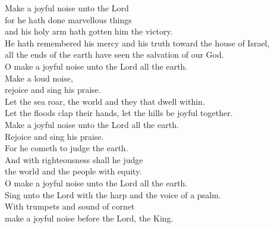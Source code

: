 {\vfill 



\clearpage
{}

\begin{center}
	
Make a joyful noise unto the Lord\\for he hath done marvellous things\\and
his holy arm hath gotten him the victory.\\
He hath remembered his mercy and his truth toward the house of Israel,\\
all the ends of the earth have seen the salvation of our God.\\
O make a joyful noise unto the Lord all the earth.\\Make a loud noise,\\
rejoice and sing his praise.\\
Let the sea roar, the world and they that dwell within.\\
Let the floods clap their hands, let the hills be joyful together.\\
Make a joyful noise unto the Lord all the earth.\\
Rejoice and sing his praise. \\For he cometh to judge the earth.\\
And with righteousness shall he judge\\the world and the people with equity.\\
O make a joyful noise unto the Lord all the earth.\\Sing unto the Lord with
the harp and the voice of a psalm.\\With trumpets and sound of cornet\\
make a joyful noise before the Lord, the King.
\end{center}

\clearpage



\begin{center}
	

\end{center}}
